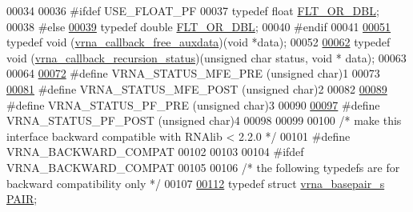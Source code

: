 \begin{DoxyCode}
00034 
00036 \textcolor{preprocessor}{#ifdef  USE\_FLOAT\_PF}
00037 \textcolor{keyword}{typedef} \textcolor{keywordtype}{float} \hyperlink{group__data__structures_ga31125aeace516926bf7f251f759b6126}{FLT\_OR\_DBL};
00038 \textcolor{preprocessor}{#else}
\hypertarget{data__structures_8h_source_l00039}{}\hyperlink{group__data__structures_ga31125aeace516926bf7f251f759b6126}{00039} \textcolor{keyword}{typedef} \textcolor{keywordtype}{double}  \hyperlink{group__data__structures_ga31125aeace516926bf7f251f759b6126}{FLT\_OR\_DBL};
00040 \textcolor{preprocessor}{#endif}
00041 
\hypertarget{data__structures_8h_source_l00051}{}\hyperlink{group__fold__compound_ga3ae51bfd5fc3236652d1de4e3274b49b}{00051} \textcolor{keyword}{typedef} void (\hyperlink{group__fold__compound_ga3ae51bfd5fc3236652d1de4e3274b49b}{vrna\_callback\_free\_auxdata})(\textcolor{keywordtype}{void} *data);
00052 
\hypertarget{data__structures_8h_source_l00062}{}\hyperlink{group__fold__compound_ga4a4a0d838de6d18315bafc84f93f5cc0}{00062} \textcolor{keyword}{typedef} void (\hyperlink{group__fold__compound_ga4a4a0d838de6d18315bafc84f93f5cc0}{vrna\_callback\_recursion\_status})(\textcolor{keywordtype}{unsigned} \textcolor{keywordtype}{char} status, \textcolor{keywordtype}{void} *
      data);
00063 
00064 
\hypertarget{data__structures_8h_source_l00072}{}\hyperlink{group__fold__compound_ga1a5053dc8acbb0111e852988726f07d6}{00072} \textcolor{preprocessor}{#define VRNA\_STATUS\_MFE\_PRE     (unsigned char)1}
00073 
\hypertarget{data__structures_8h_source_l00081}{}\hyperlink{group__fold__compound_ga47c900ca76e56e59e2e83a06e0bde641}{00081} \textcolor{preprocessor}{#define VRNA\_STATUS\_MFE\_POST    (unsigned char)2}
00082 
\hypertarget{data__structures_8h_source_l00089}{}\hyperlink{group__fold__compound_ga91795d35ebdb6f32be50459f24b3d114}{00089} \textcolor{preprocessor}{#define VRNA\_STATUS\_PF\_PRE      (unsigned char)3}
00090 
\hypertarget{data__structures_8h_source_l00097}{}\hyperlink{group__fold__compound_ga1c6fa243533fd026e50f7d595eaaa565}{00097} \textcolor{preprocessor}{#define VRNA\_STATUS\_PF\_POST     (unsigned char)4}
00098 
00099 
00100 \textcolor{comment}{/* make this interface backward compatible with RNAlib < 2.2.0 */}
00101 \textcolor{preprocessor}{#define VRNA\_BACKWARD\_COMPAT}
00102 
00103 
00104 \textcolor{preprocessor}{#ifdef VRNA\_BACKWARD\_COMPAT}
00105 
00106 \textcolor{comment}{/* the following typedefs are for backward compatibility only */}
00107 
\hypertarget{data__structures_8h_source_l00112}{}\hyperlink{group__data__structures_ga4381025ffbd692e54189b2c679c79c99}{00112} \textcolor{keyword}{typedef} \textcolor{keyword}{struct }\hyperlink{group__data__structures_structvrna__basepair__s}{vrna\_basepair\_s}  \hyperlink{group__data__structures_structvrna__basepair__s}{PAIR};

\end{DoxyCode}
